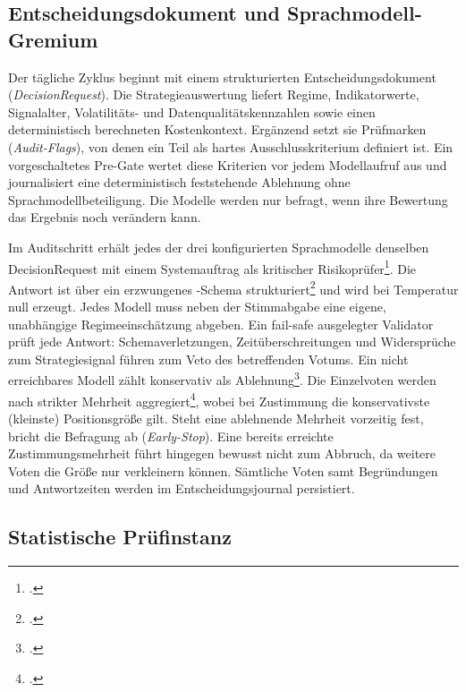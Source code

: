 \subsection{Entscheidungsdokument und Sprachmodell-Gremium}
\label{sec:umsetzung-impl-gremium}

Der tägliche Zyklus beginnt mit einem strukturierten Entscheidungsdokument
(\emph{DecisionRequest}). Die Strategieauswertung liefert Regime, Indikatorwerte,
Signalalter, Volatilitäts- und Datenqualitätskennzahlen sowie einen deterministisch
berechneten Kostenkontext. Ergänzend setzt sie Prüfmarken (\emph{Audit-Flags}), von denen
ein Teil als hartes Ausschlusskriterium definiert ist. Ein vorgeschaltetes Pre-Gate wertet
diese Kriterien vor jedem Modellaufruf aus und journalisiert eine deterministisch
feststehende Ablehnung ohne Sprachmodellbeteiligung. Die Modelle werden nur befragt, wenn
ihre Bewertung das Ergebnis noch verändern kann.

Im Auditschritt erhält jedes der drei konfigurierten Sprachmodelle denselben DecisionRequest
mit einem Systemauftrag als kritischer
Risikoprüfer\footcite[vgl.][S.~46595--46623]{zheng2023judge}. Die Antwort ist über ein erzwungenes
-Schema strukturiert\footcite[vgl.][S.~10932--10952]{gengGcd2023} und wird bei Temperatur null erzeugt. Jedes Modell
muss neben der Stimmabgabe eine eigene, unabhängige Regimeeinschätzung
abgeben. Ein fail-safe ausgelegter Validator prüft jede Antwort: Schemaverletzungen,
Zeitüberschreitungen und Widersprüche zum Strategiesignal führen zum Veto des betreffenden
Votums. Ein nicht erreichbares Modell zählt konservativ als
Ablehnung\footcite[vgl.][S.~431--445]{rebedeaNemo2023}. Die Einzelvoten
werden nach strikter Mehrheit
aggregiert\footcites[vgl.][S.~617\,f.]{ladha1992}[vgl.][S.~261--278]{grofman1983}, wobei bei Zustimmung die konservativste (kleinste)
Positionsgröße gilt. Steht eine ablehnende Mehrheit vorzeitig fest, bricht die Befragung ab
(\emph{Early-Stop}). Eine bereits erreichte Zustimmungsmehrheit führt hingegen bewusst nicht
zum Abbruch, da weitere Voten die Größe nur verkleinern können. Sämtliche Voten samt
Begründungen und Antwortzeiten werden im Entscheidungsjournal persistiert.

\subsection{Statistische Prüfinstanz}
\label{sec:umsetzung-impl-prognose}

